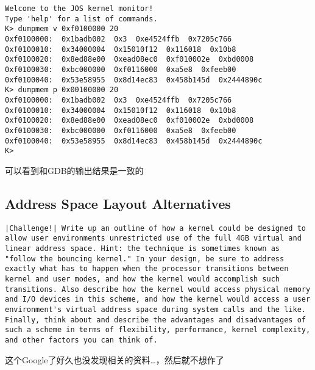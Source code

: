 \documentclass{article}
\begin{document}
\begin{CJK*}{UTF8}{gkai}
\begin{enumerate}
{\begin{lstlisting}[style=console]
Welcome to the JOS kernel monitor!
Type 'help' for a list of commands.
K> dumpmem v 0xf0100000 20
0xf0100000:  0x1badb002  0x3  0xe4524ffb  0x7205c766  
0xf0100010:  0x34000004  0x15010f12  0x116018  0x10b8  
0xf0100020:  0x8ed88e00  0xead08ec0  0xf010002e  0xbd0008  
0xf0100030:  0xbc000000  0xf0116000  0xa5e8  0xfeeb00  
0xf0100040:  0x53e58955  0x8d14ec83  0x458b145d  0x2444890c  
K> dumpmem p 0x00100000 20
0xf0100000:  0x1badb002  0x3  0xe4524ffb  0x7205c766  
0xf0100010:  0x34000004  0x15010f12  0x116018  0x10b8  
0xf0100020:  0x8ed88e00  0xead08ec0  0xf010002e  0xbd0008  
0xf0100030:  0xbc000000  0xf0116000  0xa5e8  0xfeeb00  
0xf0100040:  0x53e58955  0x8d14ec83  0x458b145d  0x2444890c  
K>
\end{lstlisting}

可以看到和GDB的输出结果是一致的
}
\end{enumerate}



\subsection{Address Space Layout Alternatives}

\begin{lstlisting}[style=challenge]
|Challenge!| Write up an outline of how a kernel could be designed to allow user environments unrestricted use of the full 4GB virtual and linear address space. Hint: the technique is sometimes known as "follow the bouncing kernel." In your design, be sure to address exactly what has to happen when the processor transitions between kernel and user modes, and how the kernel would accomplish such transitions. Also describe how the kernel would access physical memory and I/O devices in this scheme, and how the kernel would access a user environment's virtual address space during system calls and the like. Finally, think about and describe the advantages and disadvantages of such a scheme in terms of flexibility, performance, kernel complexity, and other factors you can think of.
\end{lstlisting}

这个Google了好久也没发现相关的资料\ldots，然后就不想作了

\vspace{4em}


\end{CJK*}
\end{document}
